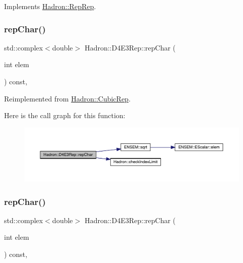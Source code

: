 Implements \mbox{\hyperlink{structHadron_1_1RepRep_ab3213025f6de249f7095892109575fde}{Hadron\+::\+Rep\+Rep}}.

\mbox{\label{structHadron_1_1D4E3Rep_afd42741649d0a7906d6232710f1522aa}} 
\subsubsection{\texorpdfstring{repChar()}{repChar()}\hspace{0.1cm}{\footnotesize\ttfamily [1/3]}}
{\footnotesize\ttfamily std\+::complex$<$double$>$ Hadron\+::\+D4\+E3\+Rep\+::rep\+Char (\begin{DoxyParamCaption}\item[{int}]{elem }\end{DoxyParamCaption}) const\hspace{0.3cm}{\ttfamily [inline]}, {\ttfamily [virtual]}}



Reimplemented from \mbox{\hyperlink{structHadron_1_1CubicRep_af45227106e8e715e84b0af69cd3b36f8}{Hadron\+::\+Cubic\+Rep}}.

Here is the call graph for this function\+:
\nopagebreak
\begin{figure}[H]
\begin{center}
\leavevmode
\includegraphics[width=350pt]{dc/d81/structHadron_1_1D4E3Rep_afd42741649d0a7906d6232710f1522aa_cgraph}
\end{center}
\end{figure}
\mbox{\label{structHadron_1_1D4E3Rep_afd42741649d0a7906d6232710f1522aa}} 
\subsubsection{\texorpdfstring{repChar()}{repChar()}\hspace{0.1cm}{\footnotesize\ttfamily [2/3]}}
{\footnotesize\ttfamily std\+::complex$<$double$>$ Hadron\+::\+D4\+E3\+Rep\+::rep\+Char (\begin{DoxyParamCaption}\item[{int}]{elem }\end{DoxyParamCaption}) const\hspace{0.3cm}{\ttfamily [inline]}, {\ttfamily [virtual]}}



